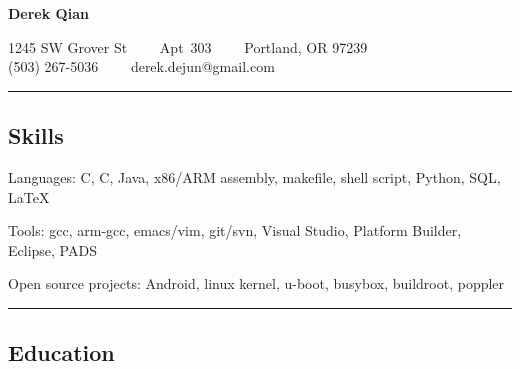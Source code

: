 \documentclass[10pt,letterpaper]{article}
\newenvironment{indentsection}[1]%
{\begin{list}{}%
	{\setlength{\leftmargin}{#1}}%
	\item[]%
}
{\end{list}}
\newcommand{\CPP}
{C\nolinebreak[4]\hspace{-.05em}\raisebox{.22ex}{\footnotesize\bf ++}}
\begin{document}
\begin{center}
{\LARGE \textbf{Derek Qian}}

1245 SW Grover St\ \ \textbullet
\ \ Apt\ 303\ \ \textbullet
\ \ Portland, OR 97239
\\
(503) 267-5036\ \ \textbullet
\ \ derek.dejun@gmail.com
\end{center}

\hrule
\vspace{-0.4em}
\subsection*{Skills}

\begin{indentsection}{\parindent}
\begin{description*}
	\item[Languages:]
	C, \CPP, Java, x86/ARM assembly, makefile, shell script, Python, SQL, \LaTeX
	\item[Tools:]
	gcc, arm-gcc, emacs/vim, git/svn, Visual Studio, Platform Builder, Eclipse, PADS
	\item[Open source projects:]
	Android, linux kernel, u-boot, busybox, buildroot, poppler
\end{description*}
\end{indentsection}

\hrule
\vspace{-0.4em}
\subsection*{Education}
\end{document}
